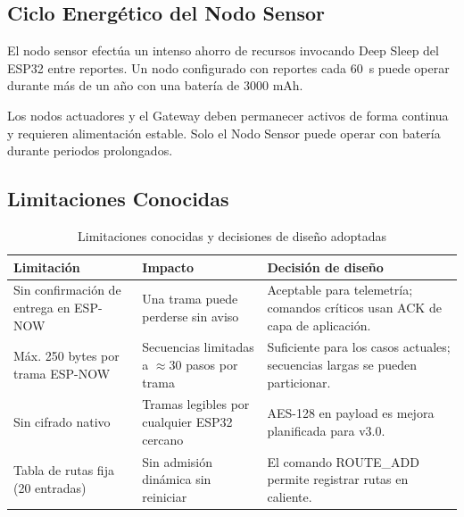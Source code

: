\subsection{Ciclo Energético del Nodo Sensor}

El nodo sensor efectúa un intenso ahorro de recursos invocando Deep Sleep del ESP32 entre
reportes. Un nodo configurado con reportes cada 60~s puede operar durante más de un año
con una batería de 3000 mAh.

\begin{warningbox}
Los nodos actuadores y el Gateway deben permanecer activos de forma continua y requieren
alimentación estable. Solo el Nodo Sensor puede operar con batería durante periodos prolongados.
\end{warningbox}

\subsection{Limitaciones Conocidas}

\begin{table}[H]
    \centering
    \caption{Limitaciones conocidas y decisiones de diseño adoptadas}
    \begin{tabular}{p{4.5cm}p{4cm}p{5.5cm}}
        \toprule
        \textbf{Limitación} & \textbf{Impacto} & \textbf{Decisión de diseño} \\
        \midrule
        Sin confirmación de entrega en ESP-NOW &
        Una trama puede perderse sin aviso &
        Aceptable para telemetría; comandos críticos usan ACK de capa de aplicación. \\
        Máx. 250 bytes por trama ESP-NOW &
        Secuencias limitadas a $\approx$30 pasos por trama &
        Suficiente para los casos actuales; secuencias largas se pueden particionar. \\
        Sin cifrado nativo &
        Tramas legibles por cualquier ESP32 cercano &
        AES-128 en payload es mejora planificada para v3.0. \\
        Tabla de rutas fija (20 entradas) &
        Sin admisión dinámica sin reiniciar &
        El comando ROUTE\_ADD permite registrar rutas en caliente. \\
        \bottomrule
    \end{tabular}
    \label{tab:limitaciones}
\end{table}
